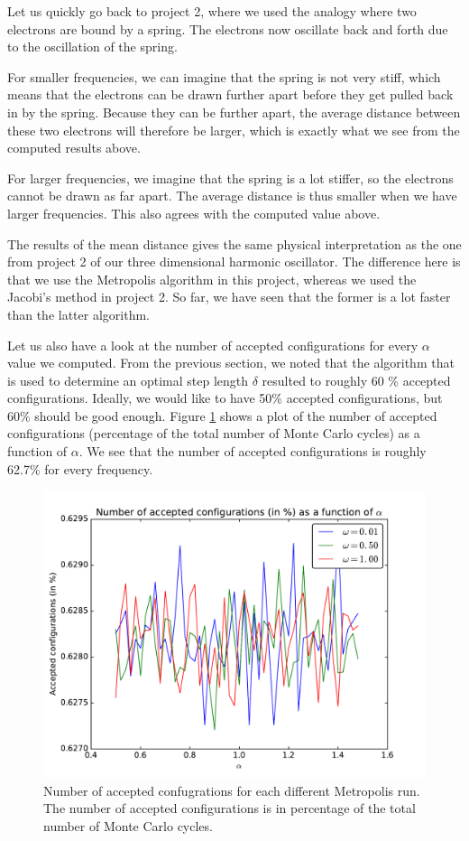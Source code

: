 \documentclass[12pt]{article}
\begin{document}
Let us quickly go back to project 2, where we used the analogy where two electrons are bound by a spring. The electrons now oscillate back and forth due to the oscillation of the spring. 

For smaller frequencies, we can imagine that the spring is not very stiff, which means that the electrons can be drawn further apart before they get pulled back in by the spring. Because they can be further apart, the average distance between these two electrons will therefore be larger, which is exactly what we see from the computed results above.

For larger frequencies, we imagine that the spring is a lot stiffer, so the electrons cannot be drawn as far apart. The average distance is thus smaller when we have larger frequencies. This also agrees with the computed value above. 

The results of the mean distance gives the same physical interpretation as the one from project 2 of our three dimensional harmonic oscillator. The difference here is that we use the Metropolis algorithm in this project, whereas we used the Jacobi's method in project 2. So far, we have seen that the former is a lot faster than the latter algorithm.

Let us also have a look at the number of accepted configurations for every $\alpha$ value we computed. From the previous section, we noted that the algorithm that is used to determine an optimal step length $\delta$ resulted to roughly 60 \% accepted configurations. Ideally, we would like to have 50\% accepted configurations, but 60\% should be good enough. Figure \ref{fig:AcceptedConfigs} shows a plot of the number of accepted configurations (percentage of the total number of Monte Carlo cycles) as a function of $\alpha$. We see that the number of accepted configurations is roughly 62.7\%  for every frequency.

\begin{figure}[h]
\centering
\includegraphics[width=\linewidth]{Plots/AcceptedConfigs.pdf}
\caption{Number of accepted confugrations for each different Metropolis run. The number of accepted configurations is in percentage of the total number of Monte Carlo cycles.}
\label{fig:AcceptedConfigs}
\end{figure}
\end{document}
